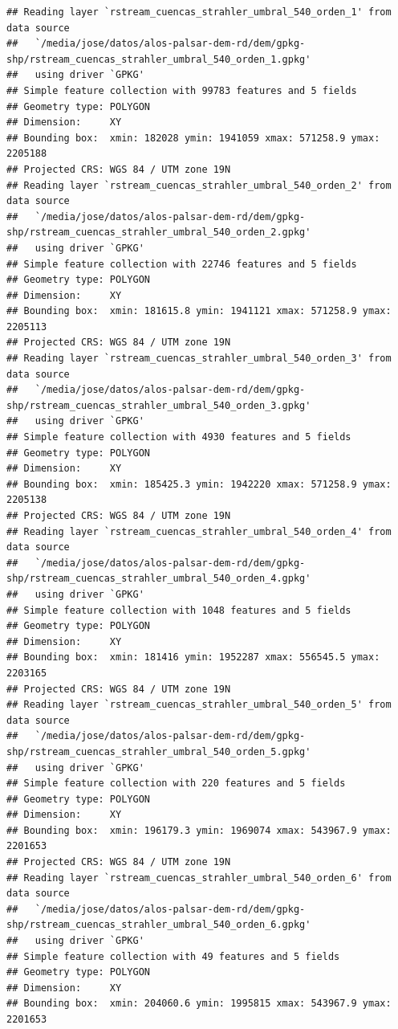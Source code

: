 \documentclass[spanish]{article}
\begin{document}
\begin{verbatim}
## Reading layer `rstream_cuencas_strahler_umbral_540_orden_1' from data source 
##   `/media/jose/datos/alos-palsar-dem-rd/dem/gpkg-shp/rstream_cuencas_strahler_umbral_540_orden_1.gpkg' 
##   using driver `GPKG'
## Simple feature collection with 99783 features and 5 fields
## Geometry type: POLYGON
## Dimension:     XY
## Bounding box:  xmin: 182028 ymin: 1941059 xmax: 571258.9 ymax: 2205188
## Projected CRS: WGS 84 / UTM zone 19N
## Reading layer `rstream_cuencas_strahler_umbral_540_orden_2' from data source 
##   `/media/jose/datos/alos-palsar-dem-rd/dem/gpkg-shp/rstream_cuencas_strahler_umbral_540_orden_2.gpkg' 
##   using driver `GPKG'
## Simple feature collection with 22746 features and 5 fields
## Geometry type: POLYGON
## Dimension:     XY
## Bounding box:  xmin: 181615.8 ymin: 1941121 xmax: 571258.9 ymax: 2205113
## Projected CRS: WGS 84 / UTM zone 19N
## Reading layer `rstream_cuencas_strahler_umbral_540_orden_3' from data source 
##   `/media/jose/datos/alos-palsar-dem-rd/dem/gpkg-shp/rstream_cuencas_strahler_umbral_540_orden_3.gpkg' 
##   using driver `GPKG'
## Simple feature collection with 4930 features and 5 fields
## Geometry type: POLYGON
## Dimension:     XY
## Bounding box:  xmin: 185425.3 ymin: 1942220 xmax: 571258.9 ymax: 2205138
## Projected CRS: WGS 84 / UTM zone 19N
## Reading layer `rstream_cuencas_strahler_umbral_540_orden_4' from data source 
##   `/media/jose/datos/alos-palsar-dem-rd/dem/gpkg-shp/rstream_cuencas_strahler_umbral_540_orden_4.gpkg' 
##   using driver `GPKG'
## Simple feature collection with 1048 features and 5 fields
## Geometry type: POLYGON
## Dimension:     XY
## Bounding box:  xmin: 181416 ymin: 1952287 xmax: 556545.5 ymax: 2203165
## Projected CRS: WGS 84 / UTM zone 19N
## Reading layer `rstream_cuencas_strahler_umbral_540_orden_5' from data source 
##   `/media/jose/datos/alos-palsar-dem-rd/dem/gpkg-shp/rstream_cuencas_strahler_umbral_540_orden_5.gpkg' 
##   using driver `GPKG'
## Simple feature collection with 220 features and 5 fields
## Geometry type: POLYGON
## Dimension:     XY
## Bounding box:  xmin: 196179.3 ymin: 1969074 xmax: 543967.9 ymax: 2201653
## Projected CRS: WGS 84 / UTM zone 19N
## Reading layer `rstream_cuencas_strahler_umbral_540_orden_6' from data source 
##   `/media/jose/datos/alos-palsar-dem-rd/dem/gpkg-shp/rstream_cuencas_strahler_umbral_540_orden_6.gpkg' 
##   using driver `GPKG'
## Simple feature collection with 49 features and 5 fields
## Geometry type: POLYGON
## Dimension:     XY
## Bounding box:  xmin: 204060.6 ymin: 1995815 xmax: 543967.9 ymax: 2201653

\end{verbatim}
\end{document}
